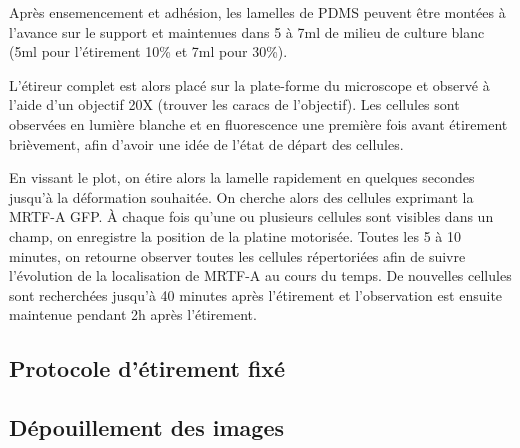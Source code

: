 \documentclass{report}
\begin{document}
	Après ensemencement et adhésion, les lamelles de PDMS peuvent être montées à l'avance sur le support et maintenues dans 5 à 7ml de milieu de culture blanc (5ml pour l'étirement 10\% et 7ml pour 30\%). 
	
	L'étireur complet est alors placé sur la plate-forme du microscope et observé à l'aide d'un objectif 20X (trouver les caracs de l'objectif). Les cellules sont observées en lumière blanche et en fluorescence une première fois avant étirement brièvement, afin d'avoir une idée de l'état de départ des cellules. 
	
	En vissant le plot, on étire alors la lamelle rapidement en quelques secondes jusqu'à la déformation souhaitée. On cherche alors des cellules exprimant la MRTF-A GFP. À chaque fois qu'une ou plusieurs cellules sont visibles dans un champ, on enregistre la position de la platine motorisée. Toutes les 5 à 10 minutes, on retourne observer toutes les cellules répertoriées afin de suivre l'évolution de la localisation de MRTF-A au cours du temps. De nouvelles cellules sont recherchées jusqu'à 40 minutes après l'étirement et l'observation est ensuite maintenue pendant 2h après l'étirement. 
	
	
	\subsection{Protocole d'étirement fixé}
	

	\subsection{Dépouillement des images}
\end{document}
